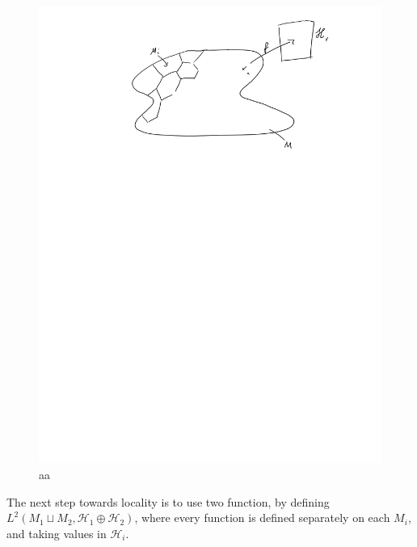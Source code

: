 \documentclass[
  12pt
]{article}
\theoremstyle{break}
\theoremstyle{plain}
\begin{document}
  \begin{figure}
  \centering
  \includegraphics[width=\textwidth]{./direct-integral-graphic-1.png}
  \caption{aa}
  \end{figure}




  The next step towards locality is to use two function, by defining
  $L^2(M_1 \sqcup M_2, \mathscr{H}_1 \oplus \mathscr{H}_2)$, where every
  function is defined separately on each $M_i$, and taking values in
  $\mathscr{H}_i$.


\end{document}
